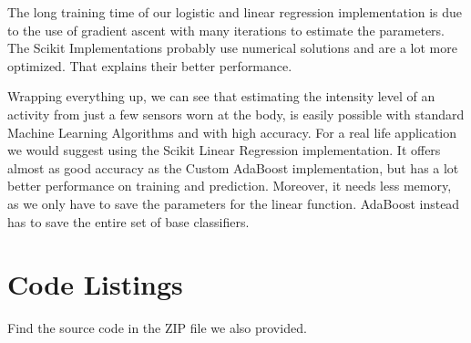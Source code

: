 \documentclass[12pt, a4paper, onecolumn, oneside, parskip=half]{scrartcl}
\begin{document}
The long training time of our logistic and linear regression implementation is due to the use of gradient ascent with many iterations to estimate the parameters. The Scikit Implementations probably use numerical solutions and are a lot more optimized. That explains their better performance.

Wrapping everything up, we can see that estimating the intensity level of an activity from just a few sensors worn at the body, is easily possible with standard Machine Learning Algorithms and with high accuracy.
For a real life application we would suggest using the Scikit Linear Regression implementation. It offers almost as good accuracy as the Custom AdaBoost implementation, but has a lot better performance on training and prediction. Moreover, it needs less memory, as we only have to save the parameters for the linear function. AdaBoost instead has to save the entire set of base classifiers.


\newpage
\pagestyle{plain}
\appendix

\section*{Code Listings}

Find the source code in the ZIP file we also provided.


\end{document}
